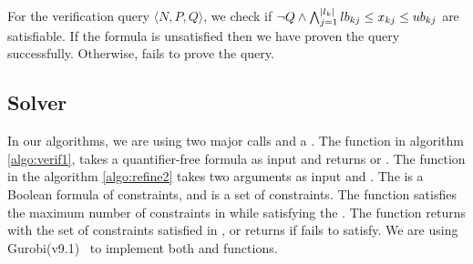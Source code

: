 For the verification query $\langle N, P, Q \rangle$, we check if
$\lnot Q \land \bigwedge_{j=1}^{|l_k|}lb_{kj} \leq x_{kj} \leq ub_{kj}$
are satisfiable.
%
If the formula is unsatisfied then we have proven the query successfully.
Otherwise, \deeppoly fails to prove the query.




\subsection{Solver}
\label{sec:solver}


In our algorithms, we are using two major calls \checksat{} and a \maxsat{}.
The function \checksat{} in algorithm \ref{algo:verif1}, 
takes a quantifier-free formula as input and returns \sat{} or \unsat{}. 
The function \maxsat{} in the algorithm \ref{algo:refine2} takes
two arguments as input \hardconstr{} and \softconstr{}. 
The \hardconstr{} is a Boolean formula of constraints,
and \softconstr{} is a set of constraints. 
The function \maxsat{} satisfies the maximum number of constraints
in \softconstr{} while satisfying the \hardconstr{}. 
The function \maxsat{} returns \sat{} with the set of
constraints satisfied in \softconstr{}, or returns
\unsat{} if \hardconstr{} fails to satisfy.
We are using Gurobi(v9.1)~\cite{gurobioptimizer} to implement 
both \checksat{} and \maxsat{} functions. 





